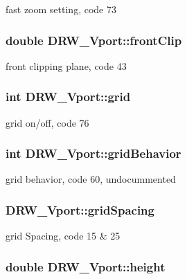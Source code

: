 fast zoom setting, code 73 \hypertarget{classDRW__Vport_a2ee10a71212915501bfdbaa532ec7107}{
\subsubsection[{front\-Clip}]{\setlength{\rightskip}{0pt plus 5cm}double D\-R\-W\-\_\-\-Vport\-::front\-Clip}}\label{classDRW__Vport_a2ee10a71212915501bfdbaa532ec7107}
front clipping plane, code 43 \hypertarget{classDRW__Vport_afd06c82134688b83439ab917d399eaa6}{
\subsubsection[{grid}]{\setlength{\rightskip}{0pt plus 5cm}int D\-R\-W\-\_\-\-Vport\-::grid}}\label{classDRW__Vport_afd06c82134688b83439ab917d399eaa6}
grid on/off, code 76 \hypertarget{classDRW__Vport_a44d1f134682b67fc14a92e468677f493}{
\subsubsection[{grid\-Behavior}]{\setlength{\rightskip}{0pt plus 5cm}int D\-R\-W\-\_\-\-Vport\-::grid\-Behavior}}\label{classDRW__Vport_a44d1f134682b67fc14a92e468677f493}
grid behavior, code 60, undocummented \hypertarget{classDRW__Vport_a0284747ef8bda7287e99534d9fdc75e5}{
\subsubsection[{grid\-Spacing}]{ D\-R\-W\-\_\-\-Vport\-::grid\-Spacing}}\label{classDRW__Vport_a0284747ef8bda7287e99534d9fdc75e5}
grid Spacing, code 15 \& 25 \hypertarget{classDRW__Vport_aae2ac1375b707a159d317051a9ff4e9e}{
\subsubsection[{height}]{\setlength{\rightskip}{0pt plus 5cm}double D\-R\-W\-\_\-\-Vport\-::height}}\label{classDRW__Vport_aae2ac1375b707a159d317051a9ff4e9e}
